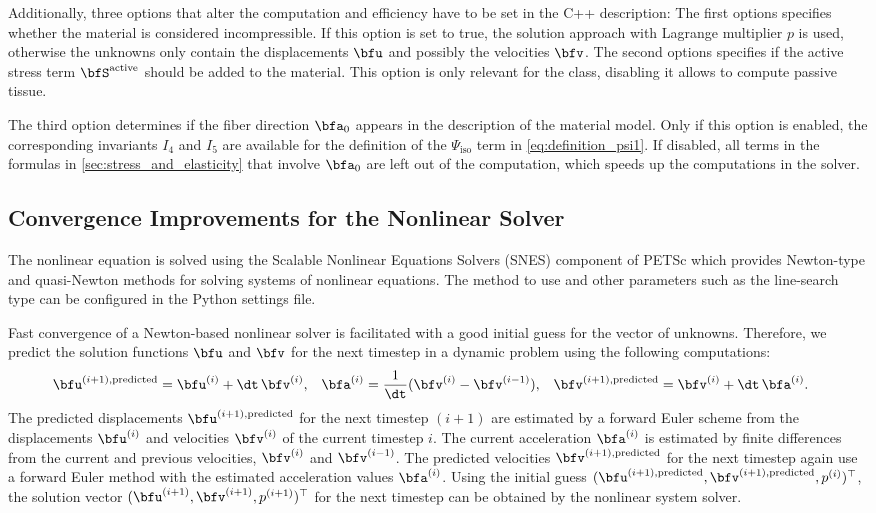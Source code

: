 Additionally, three options that alter the computation and efficiency have to be set in the C++ description: The first options specifies whether the material is considered incompressible. If this option is set to true, the solution approach with Lagrange multiplier $p$ is used, otherwise the unknowns only contain the displacements $\bfu$ and possibly the velocities $\bfv$. The second options specifies if the active stress term $\bfS^\text{active}$ should be added to the material. This option is only relevant for the  class, disabling it allows to compute passive tissue.

The third option determines if the fiber direction $\bfa_0$ appears in the description of the material model. Only if this option is enabled, the corresponding invariants $I_4$ and $I_5$ are available for the definition of the $\Psi_\text{iso}$ term in \cref{eq:definition_psi1}. If disabled, all terms in the formulas in \cref{sec:stress_and_elasticity} that involve $\bfa_0$ are left out of the computation, which speeds up the computations in the solver.

\subsection{Convergence Improvements for the Nonlinear Solver}\label{sec:convergence_improvements_for_the_nonlinear_solver}

The nonlinear equation is solved using the Scalable Nonlinear Equations Solvers (SNES) component of PETSc which provides Newton-type and quasi-Newton methods for solving systems of nonlinear equations. The method to use and other parameters such as the line-search type can be configured in the Python settings file.

Fast convergence of a Newton-based nonlinear solver is facilitated with a good initial guess for the vector of unknowns. Therefore, we predict the solution functions $\bfu$ and $\bfv$ for the next timestep in a dynamic problem using the following computations:
\begin{align*}
  \bfu^{(i+1),\text{predicted}} &= \bfu^{(i)} + \dt\,\bfv^{(i)}, & 
  \bfa^{(i)} &= \dfrac1{\dt}(\bfv^{(i)} - \bfv^{(i-1)}), & 
  \bfv^{(i+1),\text{predicted}} &= \bfv^{(i)} + \dt\,\bfa^{(i)}.
\end{align*}
%
The predicted displacements $\bfu^{(i+1),\text{predicted}}$ for the next timestep $(i+1)$ are estimated by a forward Euler scheme from the displacements $\bfu^{(i)}$ and velocities $\bfv^{(i)}$ of the current timestep $i$. The current acceleration $\bfa^{(i)}$ is estimated by finite differences from the current and previous velocities, $\bfv^{(i)}$ and $\bfv^{(i-1)}$. The predicted velocities $\bfv^{(i+1),\text{predicted}}$ for the next timestep again use a forward Euler method with the estimated acceleration values $\bfa^{(i)}$.
Using the initial guess $(\bfu^{(i+1),\text{predicted}},\bfv^{(i+1),\text{predicted}},p^{(i)})^\top$, the solution vector $(\bfu^{(i+1)},\bfv^{(i+1)},p^{(i+1)})^\top$  for the next timestep can be obtained by the nonlinear system solver.

